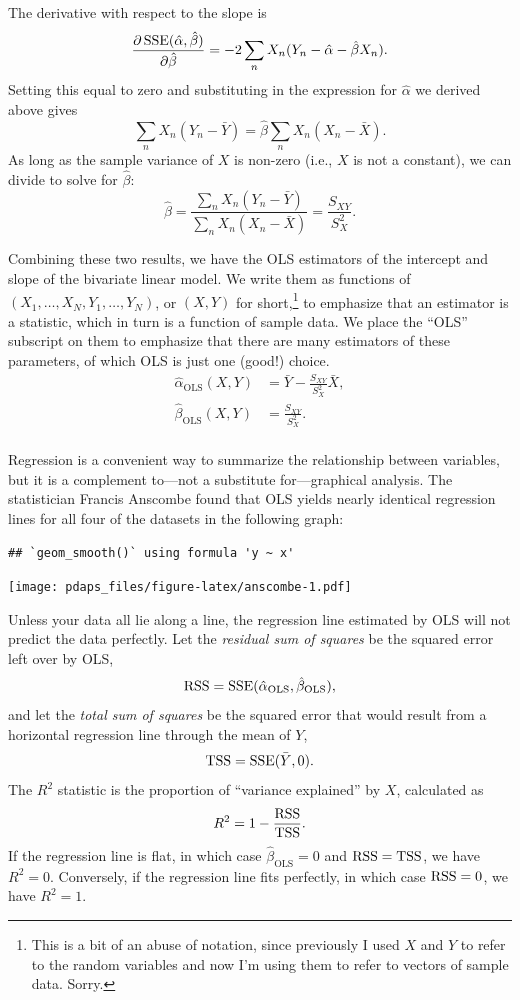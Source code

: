 \documentclass[12pt,oneside,openany]{book}
\begin{document}
The derivative with respect to the slope is \[
\frac{\partial{}\mathop{\rm SSE}\nolimits(\hat{\alpha}, \hat{\beta})}{\partial{}\hat{\beta}}
= -2 \sum_n X_n (Y_n - \hat{\alpha} - \hat{\beta} X_n).
\] Setting this equal to zero and substituting in the expression for
\(\hat{\alpha}\) we derived above gives \[
\sum_n X_n (Y_n - \bar{Y}) = \hat{\beta} \sum_n X_n (X_n - \bar{X}).
\] As long as the sample variance of \(X\) is non-zero (i.e., \(X\) is
not a constant), we can divide to solve for \(\hat{\beta}\): \[
\hat{\beta}
= \frac{\sum_n X_n (Y_n - \bar{Y})}{\sum_n X_n (X_n - \bar{X})}
= \frac{S_{XY}}{S_X^2}.
\]

Combining these two results, we have the OLS estimators of the intercept
and slope of the bivariate linear model. We write them as functions of
\((X_1, \ldots, X_N, Y_1, \ldots, Y_N)\), or \((X, Y)\) for
short,\footnote{This is a bit of an abuse of notation, since previously
  I used \(X\) and \(Y\) to refer to the random variables and now I'm
  using them to refer to vectors of sample data. Sorry.} to emphasize
that an estimator is a statistic, which in turn is a function of sample
data. We place the ``OLS'' subscript on them to emphasize that there are
many estimators of these parameters, of which OLS is just one (good!)
choice. \[
\begin{aligned}
\hat{\alpha}_{\text{OLS}}(X, Y)
&= \bar{Y} - \frac{S_{XY}}{S_X^2} \bar{X}, \\
\hat{\beta}_{\text{OLS}}(X, Y)
&= \frac{S_{XY}}{S_X^2}. \\
\end{aligned}
\]

Regression is a convenient way to summarize the relationship between
variables, but it is a complement to---not a substitute for---graphical
analysis. The statistician Francis Anscombe found that OLS yields nearly
identical regression lines for all four of the datasets in the following
graph:

\begin{verbatim}
## `geom_smooth()` using formula 'y ~ x'
\end{verbatim}

\texttt{[image: pdaps\_files/figure-latex/anscombe-1.pdf]}

Unless your data all lie along a line, the regression line estimated by
OLS will not predict the data perfectly. Let the \emph{residual sum of
squares} be the squared error left over by OLS, \[
\mathop{\rm RSS}\nolimits = \mathop{\rm SSE}\nolimits(\hat{\alpha}_{\text{OLS}}, \hat{\beta}_{\text{OLS}}),
\] and let the \emph{total sum of squares} be the squared error that
would result from a horizontal regression line through the mean of
\(Y\), \[
\mathop{\rm TSS}\nolimits = \mathop{\rm SSE}\nolimits(\bar{Y}, 0).
\] The \(R^2\) statistic is the proportion of ``variance explained'' by
\(X\), calculated as \[
R^2 = 1 - \frac{\mathop{\rm RSS}\nolimits}{\mathop{\rm TSS}\nolimits}.
\] If the regression line is flat, in which case
\(\hat{\beta}_{\text{OLS}} = 0\) and \(\mathop{\rm RSS}\nolimits = \mathop{\rm TSS}\nolimits\), we have
\(R^2= 0\). Conversely, if the regression line fits perfectly, in which
case \(\mathop{\rm RSS}\nolimits = 0\), we have \(R^2 = 1\).
\end{document}
